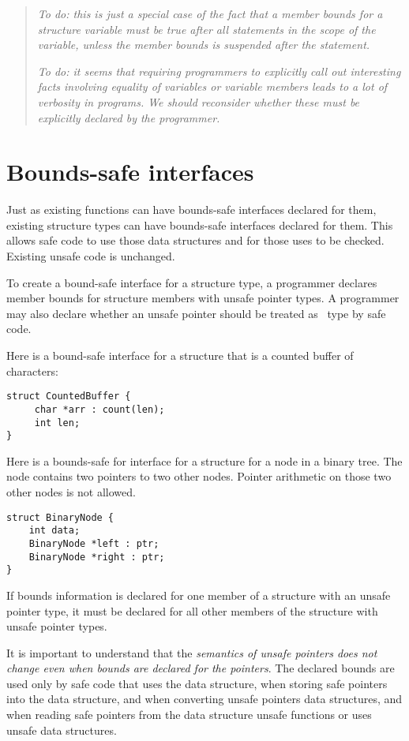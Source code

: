 \begin{quote}
\emph{To do: this is just a special case of the fact that a member
bounds for a structure variable must be true after all statements in the
scope of the variable, unless the member bounds is suspended after the
statement. }

\emph{To do: it seems that requiring programmers to explicitly call out
interesting facts involving equality of variables or variable members
leads to a lot of verbosity in programs. We should reconsider whether
these must be explicitly declared by the programmer.}
\end{quote}

\section{Bounds-safe interfaces}\label{bounds-safe-interfaces}

Just as existing functions can have bounds-safe interfaces declared for
them, existing structure types can have bounds-safe interfaces declared
for them. This allows safe code to use those data structures and for
those uses to be checked. Existing unsafe code is unchanged.

To create a bound-safe interface for a structure type, a programmer
declares member bounds for structure members with unsafe pointer types.
A programmer may also declare whether an unsafe pointer should be
treated as \ptr\ type by safe code.

Here is a bound-safe interface for a structure that is a counted buffer
of characters:

\begin{verbatim}
struct CountedBuffer {
     char *arr : count(len);
     int len;
}
\end{verbatim}

Here is a bounds-safe for interface for a structure for a node in a
binary tree. The node contains two pointers to two other nodes. Pointer
arithmetic on those two other nodes is not allowed.

\begin{verbatim}
struct BinaryNode {
    int data;
    BinaryNode *left : ptr;
    BinaryNode *right : ptr;
}
\end{verbatim}

If bounds information is declared for one member of a structure with an
unsafe pointer type, it must be declared for all other members of the
structure with unsafe pointer types.

It is important to understand that the \emph{semantics of unsafe
pointers does not change even when bounds are declared for the
pointers}. The declared bounds are used only by safe code that uses the
data structure, when storing safe pointers into the data structure, and
when converting unsafe pointers data structures, and when reading safe
pointers from the data structure unsafe functions or uses unsafe data
structures.

